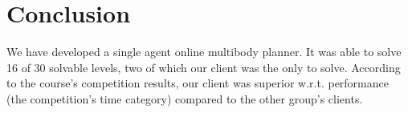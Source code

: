 \section{Conclusion}
\label{sec:conclusion}

We have developed a single agent online multibody planner.
It was able to solve 16 of 30 solvable levels, two of which our client was the only to solve.
According to the course's competition results, our client was superior w.r.t. performance (the competition's time category) compared to the other group's clients.


